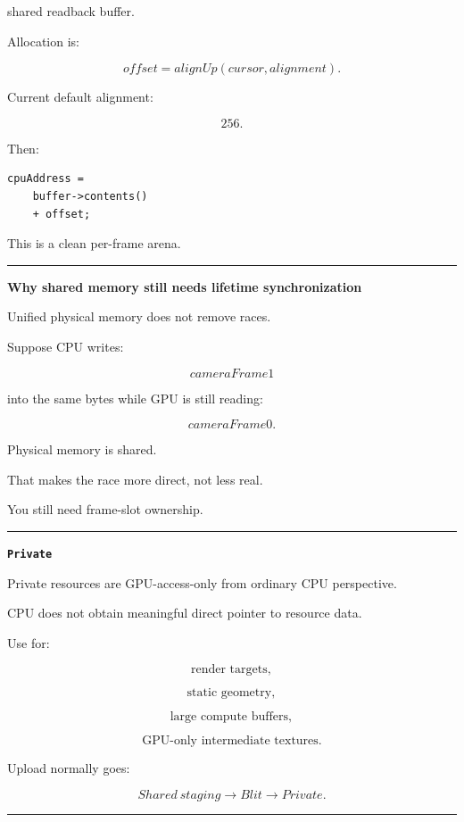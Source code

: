 shared readback buffer.

Allocation is:

\[
offset=
alignUp(cursor,alignment).
\]

Current default alignment:

\[
256.
\]

Then:

\begin{verbatim}
cpuAddress =
    buffer->contents()
    + offset;
\end{verbatim}

This is a clean per-frame arena.

\begin{center}\rule{0.5\linewidth}{0.5pt}\end{center}

\textbf{Why shared memory still needs lifetime synchronization}

Unified physical memory does not remove races.

Suppose CPU writes:

\[
cameraFrame1
\]

into the same bytes while GPU is still reading:

\[
cameraFrame0.
\]

Physical memory is shared.

That makes the race more direct, not less real.

You still need frame-slot ownership.

\begin{center}\rule{0.5\linewidth}{0.5pt}\end{center}

\textbf{\texttt{Private}}

Private resources are GPU-access-only from ordinary CPU perspective.

CPU does not obtain meaningful direct pointer to resource data.

Use for:

\[
\text{render targets},
\]

\[
\text{static geometry},
\]

\[
\text{large compute buffers},
\]

\[
\text{GPU-only intermediate textures}.
\]

Upload normally goes:

\[
Shared\ staging
\rightarrow
Blit
\rightarrow
Private.
\]

\begin{center}\rule{0.5\linewidth}{0.5pt}\end{center}

